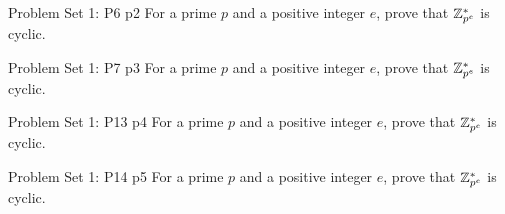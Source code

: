 \documentclass[a4paper, 11pt]{article}
\begin{document}
\begin{problem}{%
		Problem Set 1: P6
	}{p2%
	}
	For a prime $p$ and a positive integer $e$, prove that $\mathbb{Z}_{p^e}^*$ is cyclic.
\end{problem}
\solve{
}


\begin{problem}{%
		Problem Set 1: P7
	}{p3%
	}
	For a prime $p$ and a positive integer $e$, prove that $\mathbb{Z}_{p^e}^*$ is cyclic.
\end{problem}
\solve{
}


\begin{problem}{%
		Problem Set 1: P13
	}{p4%
	}
	For a prime $p$ and a positive integer $e$, prove that $\mathbb{Z}_{p^e}^*$ is cyclic.
\end{problem}
\solve{
}


\begin{problem}{%
		Problem Set 1: P14
	}{p5%
	}
	For a prime $p$ and a positive integer $e$, prove that $\mathbb{Z}_{p^e}^*$ is cyclic.
\end{problem}
\solve{
}
\end{document}
